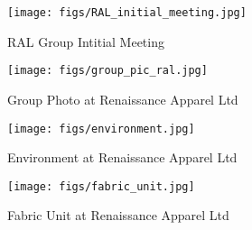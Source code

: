 \documentclass[12pt]{article}
\begin{document}
\begin{appendices}
    \begin{figure}[h!]
        \centering
        \texttt{[image: figs/RAL\_initial\_meeting.jpg]}
        \caption{RAL Group Intitial Meeting}
        \label{fig:RAL Group Intitial Meeting}
    \end{figure}

    \begin{figure}[h!]
        \centering
        \texttt{[image: figs/group\_pic\_ral.jpg]}
        \caption{Group Photo at Renaissance Apparel Ltd}
        \label{fig:group_pic_ral}
    \end{figure}

    \begin{figure}[h!]
        \centering
        \texttt{[image: figs/environment.jpg]}
        \caption{Environment at Renaissance Apparel Ltd}
        \label{fig:environment}
    \end{figure}

    \begin{figure}[h!]
        \centering
        \texttt{[image: figs/fabric\_unit.jpg]}
        \caption{Fabric Unit at Renaissance Apparel Ltd}
        \label{fig:Fabric Unit}
    \end{figure}

\end{appendices}
\clearpage


\end{document}
